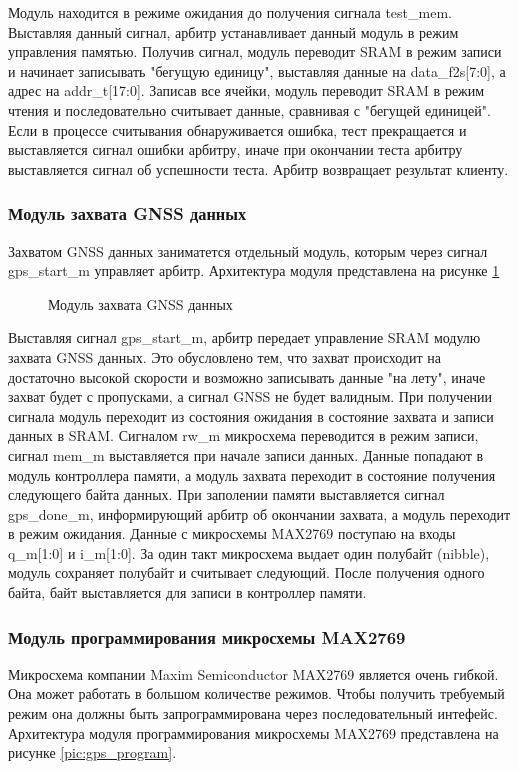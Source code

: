 Модуль находится в режиме ожидания до получения сигнала test\_mem. Выставляя данный сигнал, арбитр устанавливает данный модуль
в режим управления памятью. Получив сигнал, модуль переводит SRAM в режим записи и начинает записывать "бегущую единицу",
выставляя данные на data\_f2s[7:0], а адрес на addr\_t[17:0]. Записав все ячейки, модуль переводит SRAM в режим чтения и последовательно
считывает данные, сравнивая с "бегущей единицей". Если в процессе считывания обнаруживается ошибка, тест прекращается и 
выставляется сигнал ошибки арбитру, иначе при окончании теста арбитру выставляется сигнал об успешности теста. Арбитр возвращает
результат клиенту.

\subsubsection*{Модуль захвата GNSS данных}
\label{sec:gps_acq}
Захватом GNSS данных заниматется отдельный модуль, которым через сигнал gps\_start\_m управляет арбитр. Архитектура модуля
представлена на рисунке \ref{pic:gps_main_arch}

\begin{figure}[H]
\begin{center}
\end{center}
\caption{Модуль захвата GNSS данных}
\label{pic:gps_main_arch}
\end{figure}

Выставляя сигнал gps\_start\_m, арбитр передает управление SRAM модулю захвата GNSS данных. Это обусловлено тем, что захват 
происходит на достаточно высокой скорости и возможно записывать данные "на лету", иначе захват будет с пропусками, а сигнал GNSS
не будет валидным. При получении сигнала модуль переходит из состояния ожидания в состояние захвата и записи данных в SRAM. 
Сигналом rw\_m микросхема переводится в режим записи, сигнал mem\_m выставляется при начале записи данных. Данные попадают
в модуль контроллера памяти, а модуль захвата переходит в состояние получения следующего байта данных. При заполении памяти
выставляется сигнал gps\_done\_m, информирующий арбитр об окончании захвата, а модуль переходит в режим ожидания. Данные с
микросхемы MAX2769 поступаю на входы q\_m[1:0] и i\_m[1:0]. За один такт микросхема выдает один полубайт (nibble), модуль
сохраняет полубайт и считывает следующий. После получения одного байта, байт выставляется для записи в контроллер памяти.

\subsubsection*{Модуль программирования микросхемы MAX2769}
\label{sec:gps_program}
Микросхема компании Maxim Semiconductor MAX2769 является очень гибкой. Она может работать в большом количестве режимов.
Чтобы получить требуемый режим она должны быть запрограммирована через последовательный интефейс. Архитектура модуля
программирования микросхемы MAX2769 представлена на рисунке \ref{pic:gps_program}.

